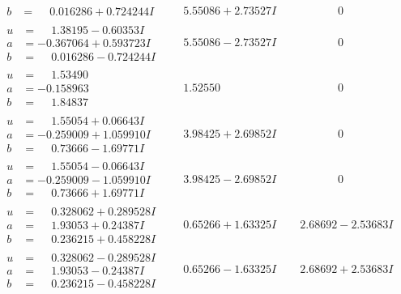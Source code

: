 \documentclass[1p]{elsarticle_modified}
\theoremstyle{definition}
\begin{document}
$$\begin{array}{c|c|c}
\begin{aligned}
b &= \phantom{-}0.016286 + 0.724244 I\end{aligned}
 & \phantom{-}5.55086 + 2.73527 I & \phantom{-0.000000 } 0 \\ \hline\begin{aligned}
u &= \phantom{-}1.38195 - 0.60353 I \\
a &= -0.367064 + 0.593723 I \\
b &= \phantom{-}0.016286 - 0.724244 I\end{aligned}
 & \phantom{-}5.55086 - 2.73527 I & \phantom{-0.000000 } 0 \\ \hline\begin{aligned}
u &= \phantom{-}1.53490\phantom{ +0.000000I} \\
a &= -0.158963\phantom{ +0.000000I} \\
b &= \phantom{-}1.84837\phantom{ +0.000000I}\end{aligned}
 & \phantom{-}1.52550\phantom{ +0.000000I} & \phantom{-0.000000 } 0 \\ \hline\begin{aligned}
u &= \phantom{-}1.55054 + 0.06643 I \\
a &= -0.259009 + 1.059910 I \\
b &= \phantom{-}0.73666 - 1.69771 I\end{aligned}
 & \phantom{-}3.98425 + 2.69852 I & \phantom{-0.000000 } 0 \\ \hline\begin{aligned}
u &= \phantom{-}1.55054 - 0.06643 I \\
a &= -0.259009 - 1.059910 I \\
b &= \phantom{-}0.73666 + 1.69771 I\end{aligned}
 & \phantom{-}3.98425 - 2.69852 I & \phantom{-0.000000 } 0 \\ \hline\begin{aligned}
u &= \phantom{-}0.328062 + 0.289528 I \\
a &= \phantom{-}1.93053 + 0.24387 I \\
b &= \phantom{-}0.236215 + 0.458228 I\end{aligned}
 & \phantom{-}0.65266 + 1.63325 I & \phantom{-}2.68692 - 2.53683 I \\ \hline\begin{aligned}
u &= \phantom{-}0.328062 - 0.289528 I \\
a &= \phantom{-}1.93053 - 0.24387 I \\
b &= \phantom{-}0.236215 - 0.458228 I\end{aligned}
 & \phantom{-}0.65266 - 1.63325 I & \phantom{-}2.68692 + 2.53683 I \\ \hline\begin{aligned}

\end{aligned}
\end{array}$$
\end{document}
